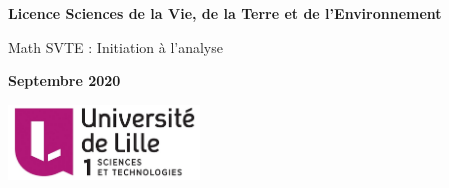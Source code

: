 \thispagestyle{empty}

\noindent
\textbf{\large Licence Sciences de la Vie, de la Terre et de l'Environnement}


\vspace{49mm}

{\Huge  Math SVTE : Initiation \`a l'analyse}
\vspace{21mm}

\begin{center}
    
\end{center}

\vfill
\hfill \textbf{\textsf{Septembre 2020}}

\includegraphics[height=2cm]{logoLILLE1.jpg}
